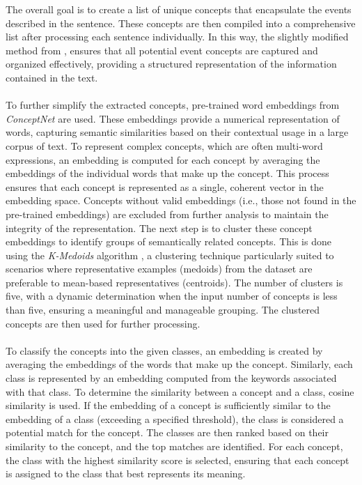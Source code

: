 \documentclass[sn-mathphys-num]{sn-jnl}%
\theoremstyle{thmstyleone}%
\theoremstyle{thmstyletwo}%
\theoremstyle{thmstylethree}%
\begin{document}
    The overall goal is to create a list of unique concepts that encapsulate the events described in the sentence. These concepts are then compiled into a comprehensive list after processing each sentence individually. In this way, the slightly modified method from \cite{10.1145/2487788.2487995}, ensures that all potential event concepts are captured and organized effectively, providing a structured representation of the information contained in the text.\\\\
    To further simplify the extracted concepts, pre-trained word embeddings from \textit{ConceptNet} are used. These embeddings provide a numerical representation of words, capturing semantic similarities based on their contextual usage in a large corpus of text. To represent complex concepts, which are often multi-word expressions, an embedding is computed for each concept by averaging the embeddings of the individual words that make up the concept. This process ensures that each concept is represented as a single, coherent vector in the embedding space. Concepts without valid embeddings (i.e., those not found in the pre-trained embeddings) are excluded from further analysis to maintain the integrity of the representation. The next step is to cluster these concept embeddings to identify groups of semantically related concepts. This is done using the \textit{K-Medoids} algorithm \cite{PARK20093336}, a clustering technique particularly suited to scenarios where representative examples (medoids) from the dataset are preferable to mean-based representatives (centroids). The number of clusters is five, with a dynamic determination when the input number of concepts is less than five, ensuring a meaningful and manageable grouping. The clustered concepts are then used for further processing.\\\\
    To classify the concepts into the given classes, an embedding is created by averaging the embeddings of the words that make up the concept. Similarly, each class is represented by an embedding computed from the keywords associated with that class. To determine the similarity between a concept and a class, cosine similarity is used.  If the embedding of a concept is sufficiently similar to the embedding of a class (exceeding a specified threshold), the class is considered a potential match for the concept. The classes are then ranked based on their similarity to the concept, and the top matches are identified. For each concept, the class with the highest similarity score is selected, ensuring that each concept is assigned to the class that best represents its meaning.
\end{document}
